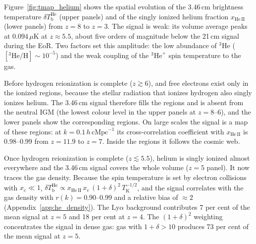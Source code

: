     \caption{Spatial evolution of the 3.46\,cm brightness temperature $\delta T^\mathrm{He}_\mathrm{b}$ (top panels), from the gas-cell maps, and of the singly ionized helium fraction $x_\mathrm{He\,II}$ (bottom panels), from $z = 8$ to $z = 3$ within a $500\,\mathrm{cMpc}$ \lumina volume.}



Figure~\ref{fig:tmap_helium} shows the spatial evolution of the 3.46\,cm brightness temperature $\delta T_\mathrm{b}^\mathrm{He}$ (upper panels) and of the singly ionized helium fraction $x_\mathrm{He\,II}$ (lower panels) from $z = 8$ to $z = 3$. The signal is weak: its volume average peaks at $0.094\,\mu\mathrm{K}$ at $z \approx 5.5$, about five orders of magnitude below the 21\,cm signal during the EoR. Two factors set this amplitude: the low abundance of $^3$He ($[^3\mathrm{He}/\mathrm{H}] \sim 10^{-5}$) and the weak coupling of the $^3\mathrm{He}^+$ spin temperature to the gas.

Before hydrogen reionization is complete ($z \gtrsim 6$),  and free electrons exist only in the ionized regions, because the stellar radiation that ionizes hydrogen also singly ionizes helium. The 3.46\,cm signal therefore fills the  regions and is absent from the neutral IGM (the lowest colour level in the upper panels at $z = 8$--6), and the lower panels show the corresponding  regions. On large scales the signal is a map of these regions: at $k = 0.1\,h\,\mathrm{cMpc}^{-1}$ its cross-correlation coefficient with $x_\mathrm{He\,II}$ is 0.98--0.99 from $z = 11.9$ to $z = 7$. Inside the regions it follows the cosmic web.

Once hydrogen reionization is complete ($z \lesssim 5.5$), helium is singly ionized almost everywhere and the 3.46\,cm signal covers the whole volume ($z = 5$ panel). It now traces the gas density. Because the spin temperature is set by electron collisions with $x_c \ll 1$, $\delta T_\mathrm{b}^\mathrm{He} \propto x_\mathrm{He\,II}\,x_e\,(1+\delta)^2\,T_\mathrm{K}^{-1/2}$, and the signal correlates with the gas density with $r(k) = 0.90$--$0.99$ and a relative bias of $\approx 2$ (Appendix~\ref{app:he_density}). The  Ly$\alpha$ background contributes 7 per cent of the mean signal at $z = 5$ and 18 per cent at $z = 4$. The $(1+\delta)^2$ weighting concentrates the signal in dense gas: gas with $1+\delta > 10$ produces 73 per cent of the mean signal at $z = 5$.


